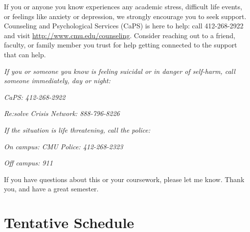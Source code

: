 \documentclass[11pt,letterpaper]{article}
\begin{document}
\medskip
\noindent
If you or anyone you know experiences any academic stress, difficult life events, or feelings like anxiety or depression, we strongly encourage you to seek support. Counseling and Psychological Services (CaPS) is here to help: call 412-268-2922 and visit \href{http://www.cmu.edu/counseling}{http://www.cmu.edu/counseling}. Consider reaching out to a friend, faculty, or family member you trust for help getting connected to the support that can help.

\medskip
\noindent
\textit{If you or someone you know is feeling suicidal or in danger of self-harm, call someone immediately, day or night:}

\textit{CaPS: 412-268-2922}

\textit{Re:solve Crisis Network: 888-796-8226}

\medskip
\noindent
\textit{If the situation is life threatening, call the police:}

\textit{On campus: CMU Police: 412-268-2323}

\textit{Off campus: 911}

\medskip
\noindent
If you have questions about this or your coursework, please let me know. Thank you, and have a great semester.


\section*{Tentative Schedule}
\end{document}
